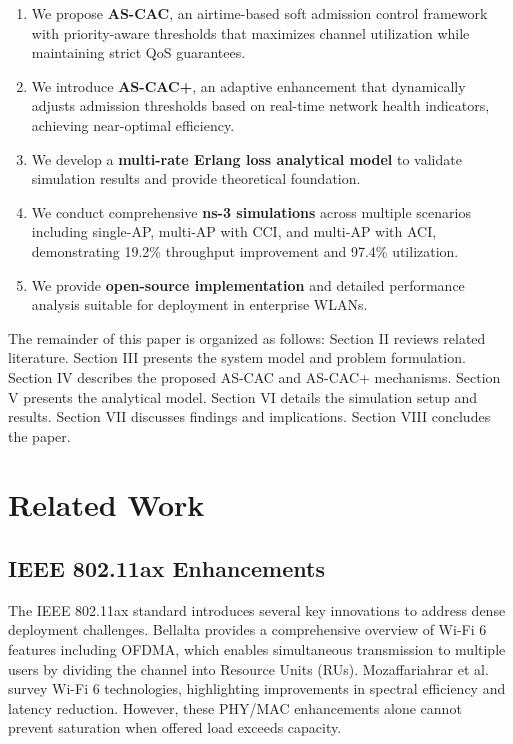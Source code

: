 \documentclass[conference]{IEEEtran}
\begin{document}
\begin{enumerate}
    \item We propose \textbf{AS-CAC}, an airtime-based soft admission control framework with priority-aware thresholds that maximizes channel utilization while maintaining strict QoS guarantees.
    
    \item We introduce \textbf{AS-CAC+}, an adaptive enhancement that dynamically adjusts admission thresholds based on real-time network health indicators, achieving near-optimal efficiency.
    
    \item We develop a \textbf{multi-rate Erlang loss analytical model} to validate simulation results and provide theoretical foundation.
    
    \item We conduct comprehensive \textbf{ns-3 simulations} across multiple scenarios including single-AP, multi-AP with CCI, and multi-AP with ACI, demonstrating 19.2\% throughput improvement and 97.4\% utilization.
    
    \item We provide \textbf{open-source implementation} and detailed performance analysis suitable for deployment in enterprise WLANs.
\end{enumerate}

The remainder of this paper is organized as follows: Section II reviews related literature. Section III presents the system model and problem formulation. Section IV describes the proposed AS-CAC and AS-CAC+ mechanisms. Section V presents the analytical model. Section VI details the simulation setup and results. Section VII discusses findings and implications. Section VIII concludes the paper.

\section{Related Work}

\subsection{IEEE 802.11ax Enhancements}

The IEEE 802.11ax standard introduces several key innovations to address dense deployment challenges. Bellalta \cite{2} provides a comprehensive overview of Wi-Fi 6 features including OFDMA, which enables simultaneous transmission to multiple users by dividing the channel into Resource Units (RUs). Mozaffariahrar et al. \cite{13} survey Wi-Fi 6 technologies, highlighting improvements in spectral efficiency and latency reduction. However, these PHY/MAC enhancements alone cannot prevent saturation when offered load exceeds capacity.
\end{document}
